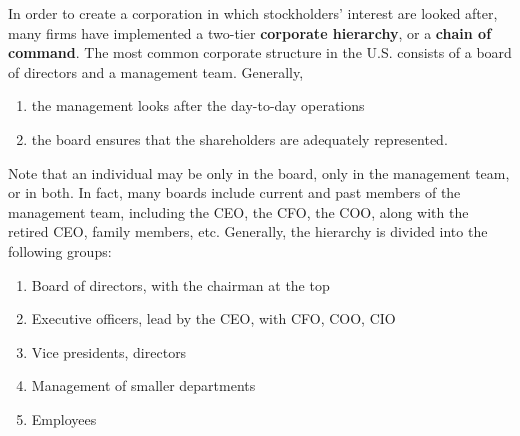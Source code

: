 \documentclass{article}
\begin{document}
    \begin{definition}
      In order to create a corporation in which stockholders' interest are looked after, many firms have implemented a two-tier \textbf{corporate hierarchy}, or a \textbf{chain of command}. The most common corporate structure in the U.S. consists of a board of directors and a management team. Generally, 
      \begin{enumerate}
          \item the management looks after the day-to-day operations
          \item the board ensures that the shareholders are adequately represented. 
      \end{enumerate}
      Note that an individual may be only in the board, only in the management team, or in both. In fact, many boards include current and past members of the management team, including the CEO, the CFO, the COO, along with the retired CEO, family members, etc. Generally, the hierarchy is divided into the following groups: 
      \begin{enumerate}
          \item Board of directors, with the chairman at the top
          \item Executive officers, lead by the CEO, with CFO, COO, CIO
          \item Vice presidents, directors 
          \item Management of smaller departments
          \item Employees
      \end{enumerate}
    \end{definition}
\end{document}
